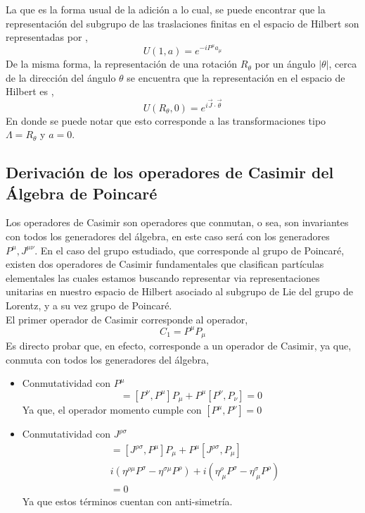 \documentclass[12pt,letterpaper]{article}
\begin{document}
 La que es la forma usual de la adición a lo cual, se puede encontrar que la representación del subgrupo de las traslaciones finitas en el espacio de Hilbert son representadas por \cite{weinberg-v1},
 \begin{equation}
   U(1,a) = e^{-iP^\mu a_\mu}
  \end{equation}
De la misma forma, la representación de una rotación $R_\theta$  por un ángulo $|\theta|$, cerca de la dirección del ángulo $\theta$ se encuentra que la representación en el espacio de Hilbert es \cite{weinberg-v1},
\begin{equation}
  U(R_\theta,0) = e^{i\vec{J}\cdot\vec{\theta}}
 \end{equation}
En donde se puede notar que esto corresponde a las transformaciones tipo $\Lambda=R_\theta$ y $a = 0$.
\subsection{Derivación de los operadores de Casimir del Álgebra de Poincaré}
Los operadores de Casimir son operadores que conmutan, o sea, son invariantes con todos los generadores del álgebra, en este caso será con los generadores $P^\mu,J^{\mu\nu}$. En el caso del grupo estudiado, que corresponde al grupo de Poincaré, existen dos operadores de Casimir fundamentales que clasifican partículas elementales las cuales estamos buscando representar via representaciones unitarias en nuestro espacio de Hilbert asociado al subgrupo de Lie del grupo de Lorentz, y a su vez grupo de Poincaré. \\
El primer operador de Casimir \cite{weinberg-v1} corresponde al operador,
\begin{equation}
  C_1 = P^\mu P_\mu
 \end{equation}
 Es directo probar que, en efecto, corresponde a un operador de Casimir, ya que, conmuta con todos los generadores del álgebra,
 \begin{itemize}
  \item Conmutatividad con $P^\mu$
   \begin{equation*}
     [P^\nu, P^\mu P_\mu]  = [P^\nu,P^\mu]P_\mu + P^\mu [P^\nu,P_\nu] = 0
    \end{equation*}
    Ya que, el operador momento cumple con $[P^\mu,P^\nu]=0$
    \item Conmutatividad con $J^{\rho\sigma}$
    \begin{align*}
      [J^{\rho\sigma},P^\mu P_\mu] & = [J^{\rho \sigma},P^\mu] P_\mu + P^\mu [J^{\rho\sigma},P_\mu] \\
      & i \left( \eta^{\rho\mu} P^\sigma - \eta^{\sigma\mu}P^\rho \right) + i \left( \eta^\rho_{\;\mu} P^\sigma - \eta^\sigma_{\;\mu} P^\rho \right) \\
      & = 0
    \end{align*}
    Ya que estos términos cuentan con anti-simetría.
 \end{itemize}
\end{document}
